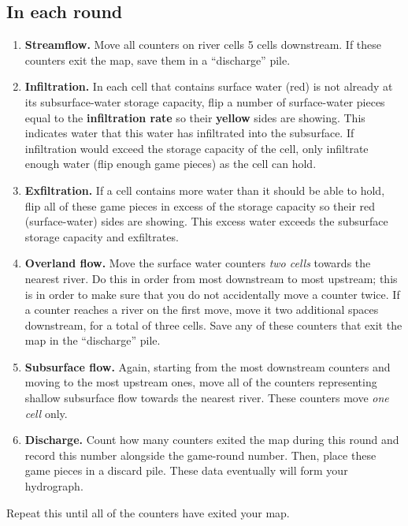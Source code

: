 \documentclass[letterpaper,10pt]{amsart}
\begin{document}
\newpage

\subsection{In each round}
\begin{enumerate}
 \item \textbf{Streamflow.} Move all counters on river cells 5 cells downstream. If these counters exit the map, save them in a ``discharge'' pile.
 \item \textbf{Infiltration.} In each cell that contains surface water (red) is not already at its subsurface-water storage capacity, flip a number of surface-water pieces equal to the \textbf{infiltration rate} so their \textbf{yellow} sides are showing. This indicates water that this water has infiltrated into the subsurface. If infiltration would exceed the storage capacity of the cell, only infiltrate enough water (flip enough game pieces) as the cell can hold.
 \item \textbf{Exfiltration.} If a cell contains more water than it should be able to hold, flip all of these game pieces in excess of the storage capacity so their red (surface-water) sides are showing. This excess water exceeds the subsurface storage capacity and exfiltrates.
 \item \textbf{Overland flow.} Move the surface water counters \textit{two cells} towards the nearest river. Do this in order from most downstream to most upstream; this is in order to make sure that you do not accidentally move a counter twice. If a counter reaches a river on the first move, move it two additional spaces downstream, for a total of three cells. Save any of these counters that exit the map in the ``discharge'' pile.
 \item \textbf{Subsurface flow.} Again, starting from the most downstream counters and moving to the most upstream ones, move all of the counters representing shallow subsurface flow towards the nearest river. These counters move \textit{one cell} only.
 \item \textbf{Discharge.} Count how many counters exited the map during this round and record this number alongside the game-round number. Then, place these game pieces in a discard pile. These data eventually will form your hydrograph.
\end{enumerate}

Repeat this until all of the counters have exited your map.
\end{document}

